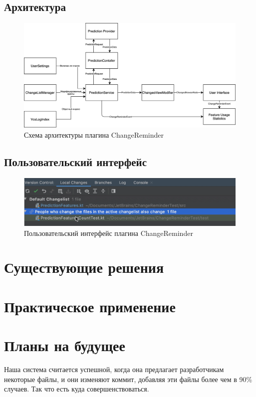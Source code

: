 \documentclass[times]{itmo-student-thesis}
\begin{document}
\subsection{Архитектура}
\begin{figure}[!h]
\caption{Схема архитектуры плагина ChangeReminder}\label{ChangeReminder-arch}
\centering
\includegraphics[scale=0.12]{ChangeReminderArch.png}
\end{figure}

\subsection{Пользовательский интерфейс}
\begin{figure}[!h]
\caption{Пользовательский интерфейс плагина ChangeReminder}\label{ChangeReminder-ui}
\centering
\includegraphics[scale=0.4]{ChangeReminderUI.png}
\end{figure}
\section{Существующие решения}
\section{Практическое применение}
\section{Планы на будущее}
Наша система считается успешной, когда она предлагает разработчикам некоторые файлы, и они изменяют коммит, добавляя эти файлы более чем в 90\% случаев. Так что есть куда совершенствоваться.
\end{document}

